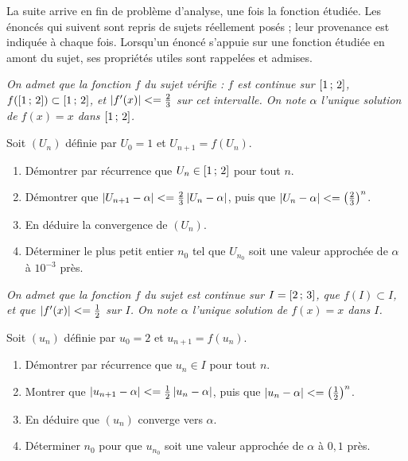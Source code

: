\begin{annales}
La suite arrive en fin de problème d'analyse, une fois la fonction étudiée.
Les énoncés qui suivent sont repris de sujets réellement posés ; leur
provenance est indiquée à chaque fois. Lorsqu'un énoncé s'appuie sur une
fonction étudiée en amont du sujet, ses propriétés utiles sont rappelées et
admises.

\emph{On admet que la fonction $f$ du sujet vérifie : $f$ est continue sur
$\left[1\,;\,2\right]$, $f\!\left(\left[1\,;\,2\right]\right) \subset
\left[1\,;\,2\right]$, et $\left|f'(x)\right| <= \frac23$ sur cet intervalle. On note
$\alpha$ l'unique solution de $f(x) = x$ dans $\left[1\,;\,2\right]$.}

Soit $(U_{n})$ définie par $U_{0} = 1$ et $U_{n+1} = f(U_{n})$.
\begin{enumerate}[label=\textbf{\alph*)}, leftmargin=*, itemsep=0.15em]
  \item Démontrer par récurrence que $U_{n} \in \left[1\,;\,2\right]$ pour tout
        $n$.
  \item Démontrer que $\left|U_{n+1}-\alpha\right| <= \frac23\left|U_{n}-\alpha\right|$,
        puis que $\left|U_{n}-\alpha\right| <= \left(\frac23\right)^{n}$.
  \item En déduire la convergence de $(U_{n})$.
  \item Déterminer le plus petit entier $n_{0}$ tel que $U_{n_{0}}$ soit une
        valeur approchée de $\alpha$ à $10^{-3}$ près.
\end{enumerate}

\emph{On admet que la fonction $f$ du sujet est continue sur
$I = \left[2\,;\,3\right]$, que $f(I) \subset I$, et que
$\left|f'(x)\right| <= \frac12$ sur $I$. On note $\alpha$ l'unique solution de
$f(x) = x$ dans $I$.}

Soit $(u_{n})$ définie par $u_{0} = 2$ et $u_{n+1} = f(u_{n})$.
\begin{enumerate}[label=\textbf{\alph*)}, leftmargin=*, itemsep=0.15em]
  \item Démontrer par récurrence que $u_{n} \in I$ pour tout $n$.
  \item Montrer que $\left|u_{n+1}-\alpha\right| <= \frac12\left|u_{n}-\alpha\right|$,
        puis que $\left|u_{n}-\alpha\right| <= \left(\frac12\right)^{n}$.
  \item En déduire que $(u_{n})$ converge vers $\alpha$.
  \item Déterminer $n_{0}$ pour que $u_{n_{0}}$ soit une valeur approchée de
        $\alpha$ à $0{,}1$ près.
\end{enumerate}


\end{annales}

